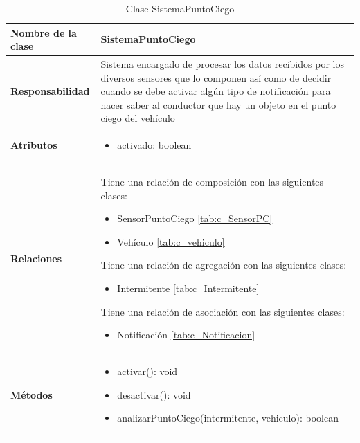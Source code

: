 \begin{table}[h]
\begin{center}
\begin{tabular}{p{} p{11cm}}
\textbf{Nombre de la clase} &  SistemaPuntoCiego\\ \hline \hline
\textbf{Responsabilidad} &  Sistema encargado de procesar los datos recibidos por los diversos sensores que lo componen así como de decidir cuando se debe activar algún tipo de notificación para hacer saber al conductor que hay un objeto en el punto ciego del vehículo\\ \hline
\textbf{Atributos} &  \begin{itemize} \item activado: boolean \end{itemize}\\ \hline
\textbf{Relaciones} & \par Tiene una relación de composición con las siguientes clases:
                      \begin{itemize}
                        \item SensorPuntoCiego \ref{tab:c_SensorPC}
                        \item Vehículo \ref{tab:c_vehiculo}
                      \end{itemize}

                      \par Tiene una relación de agregación con las siguientes clases:
                        \begin{itemize}
                          \item Intermitente \ref{tab:c_Intermitente}
                        \end{itemize}

                      \par Tiene una relación de asociación con las siguientes clases:
                      \begin{itemize}
                        \item Notificación \ref{tab:c_Notificacion}
                      \end{itemize}\\ \hline

\textbf{Métodos} &  \begin{itemize}
                      \item activar(): void
                      \item desactivar(): void
                      \item analizarPuntoCiego(intermitente, vehiculo): boolean
                    \end{itemize}\\ \hline
\end{tabular}
\caption{Clase SistemaPuntoCiego}
\label{tab:c_SPCiego}
\end{center}
\end{table}









